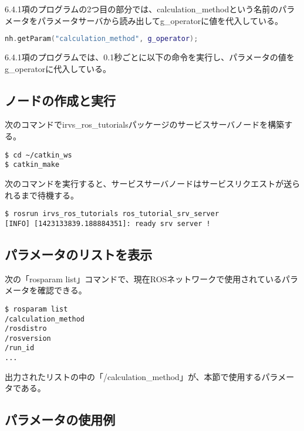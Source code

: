 6.4.1項のプログラムの2つ目の部分では、calculation\_methodという名前のパラメータをパラメータサーバから読み出してg\_operatorに値を代入している。

\begin{lstlisting}[language=C++]
nh.getParam("calculation_method", g_operator);
\end{lstlisting}

6.4.1項のプログラムでは、0.1秒ごとに以下の命令を実行し、パラメータの値をg\_operatorに代入している。

\subsection{ノードの作成と実行}

次のコマンドでirvs\_ros\_tutorialsパッケージのサービスサーバノードを構築する。

\begin{lstlisting}[language=ROS]
$ cd ~/catkin_ws
$ catkin_make
\end{lstlisting}

次のコマンドを実行すると、サービスサーバノードはサービスリクエストが送られるまで待機する。

\begin{lstlisting}[language=ROS]
$ rosrun irvs_ros_tutorials ros_tutorial_srv_server
[INFO] [1423133839.188884351]: ready srv server !
\end{lstlisting}

\subsection{パラメータのリストを表示}

次の「rosparam list」コマンドで、現在ROSネットワークで使用されているパラメータを確認できる。

\begin{lstlisting}[language=ROS]
$ rosparam list
/calculation_method
/rosdistro
/rosversion
/run_id
...
\end{lstlisting}

出力されたリストの中の「/calculation\_method」が、本節で使用するパラメータである。

\subsection{パラメータの使用例}

